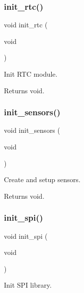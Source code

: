 \subsubsection{\texorpdfstring{init\+\_\+rtc()}{init\_rtc()}}
{\footnotesize\ttfamily void init\+\_\+rtc (\begin{DoxyParamCaption}\item[{void}]{ }\end{DoxyParamCaption})}



Init R\+TC module. 

\begin{DoxyReturn}{Returns}
void. 
\end{DoxyReturn}
\mbox{\label{i2c-th_8ino_ac74850003fab6eb3269bfe043d0f939c}} 
\subsubsection{\texorpdfstring{init\+\_\+sensors()}{init\_sensors()}}
{\footnotesize\ttfamily void init\+\_\+sensors (\begin{DoxyParamCaption}\item[{void}]{ }\end{DoxyParamCaption})}



Create and setup sensors. 

\begin{DoxyReturn}{Returns}
void. 
\end{DoxyReturn}
\mbox{\label{i2c-th_8ino_a8eb9780a3438ec02c70314744f91f3c7}} 
\subsubsection{\texorpdfstring{init\+\_\+spi()}{init\_spi()}}
{\footnotesize\ttfamily void init\+\_\+spi (\begin{DoxyParamCaption}\item[{void}]{ }\end{DoxyParamCaption})}



Init S\+PI library. 

